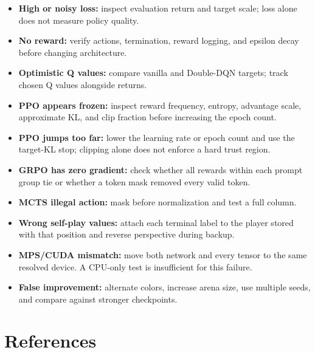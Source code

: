 \documentclass[11pt]{article}
\begin{document}
\begin{itemize}
\item \textbf{High or noisy loss:} inspect evaluation return and target scale;
loss alone does not measure policy quality.
\item \textbf{No reward:} verify actions, termination, reward logging, and
epsilon decay before changing architecture.
\item \textbf{Optimistic Q values:} compare vanilla and Double-DQN targets;
track chosen Q values alongside returns.
\item \textbf{PPO appears frozen:} inspect reward frequency, entropy, advantage
scale, approximate KL, and clip fraction before increasing the epoch count.
\item \textbf{PPO jumps too far:} lower the learning rate or epoch count and use
the target-KL stop; clipping alone does not enforce a hard trust region.
\item \textbf{GRPO has zero gradient:} check whether all rewards within each
prompt group tie or whether a token mask removed every valid token.
\item \textbf{MCTS illegal action:} mask before normalization and test a full column.
\item \textbf{Wrong self-play values:} attach each terminal label to the player
stored with that position and reverse perspective during backup.
\item \textbf{MPS/CUDA mismatch:} move both network and every tensor to the same
resolved device. A CPU-only test is insufficient for this failure.
\item \textbf{False improvement:} alternate colors, increase arena size, use
multiple seeds, and compare against stronger checkpoints.
\end{itemize}

\section{References}
\end{document}
